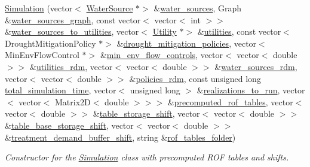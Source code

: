 \begin{DoxyCompactItemize}
\mbox{\hyperlink{classSimulation_a99c76e396f63ca8f98d362c76804345b}{Simulation}} (vector$<$ \mbox{\hyperlink{classWaterSource}{Water\+Source}} $\ast$$>$ \&\mbox{\hyperlink{classSimulation_a7cf5edb885d26074e51e183408a3adab}{water\+\_\+sources}}, Graph \&\mbox{\hyperlink{classSimulation_a04d4514b77ae98ec66cb8c2d633b2a52}{water\+\_\+sources\+\_\+graph}}, const vector$<$ vector$<$ int $>$$>$ \&\mbox{\hyperlink{classSimulation_ab2825b5561679583c89a3936ce7dea39}{water\+\_\+sources\+\_\+to\+\_\+utilities}}, vector$<$ \mbox{\hyperlink{classUtility}{Utility}} $\ast$$>$ \&\mbox{\hyperlink{classSimulation_a0de77bedebd4b324d334340b11f5afa6}{utilities}}, const vector$<$ Drought\+Mitigation\+Policy $\ast$$>$ \&\mbox{\hyperlink{classSimulation_a23df9c17244a1cde0e32b42829623724}{drought\+\_\+mitigation\+\_\+policies}}, vector$<$ Min\+Env\+Flow\+Control $\ast$$>$ \&\mbox{\hyperlink{classSimulation_a91d4cbb85145e9ebb5a9cb5d24dace15}{min\+\_\+env\+\_\+flow\+\_\+controls}}, vector$<$ vector$<$ double $>$$>$ \&\mbox{\hyperlink{classSimulation_a0e0766513f36e2e95e83b0611c3c078c}{utilities\+\_\+rdm}}, vector$<$ vector$<$ double $>$$>$ \&\mbox{\hyperlink{classSimulation_afd35d5f1a11036d7c64668274ba0cc20}{water\+\_\+sources\+\_\+rdm}}, vector$<$ vector$<$ double $>$$>$ \&\mbox{\hyperlink{classSimulation_a4fd8d11506b6427577c9d8aa43932b2c}{policies\+\_\+rdm}}, const unsigned long \mbox{\hyperlink{classSimulation_a6c7ad426929c59e061750b6d923aa859}{total\+\_\+simulation\+\_\+time}}, vector$<$ unsigned long $>$ \&\mbox{\hyperlink{classSimulation_a6753fbf18cf9793b0ea3f4c070836af3}{realizations\+\_\+to\+\_\+run}}, vector$<$ vector$<$ Matrix2D$<$ double $>$$>$$>$ \&\mbox{\hyperlink{classSimulation_a7fc97bea88fee3f551d22042ae813428}{precomputed\+\_\+rof\+\_\+tables}}, vector$<$ vector$<$ double $>$$>$ \&\mbox{\hyperlink{classSimulation_a024cbe4c66a4329c5f12009434b8bdc2}{table\+\_\+storage\+\_\+shift}}, vector$<$ vector$<$ double $>$$>$ \&\mbox{\hyperlink{classSimulation_ad2d6987ec81948619b26f7b687bb03cf}{table\+\_\+base\+\_\+storage\+\_\+shift}}, vector$<$ vector$<$ double $>$$>$ \&\mbox{\hyperlink{classSimulation_acc283f08e6d30c3221676eccc555cc7b}{treatment\+\_\+demand\+\_\+buffer\+\_\+shift}}, string \&\mbox{\hyperlink{classSimulation_aca810eb7785417158d897dfdf366e9fa}{rof\+\_\+tables\+\_\+folder}})
\begin{DoxyCompactList}\small\item\em Constructor for the \mbox{\hyperlink{classSimulation}{Simulation}} class with precomputed R\+OF tables and shifts. \end{DoxyCompactList}\item 
$$
\end{DoxyCompactItemize}
